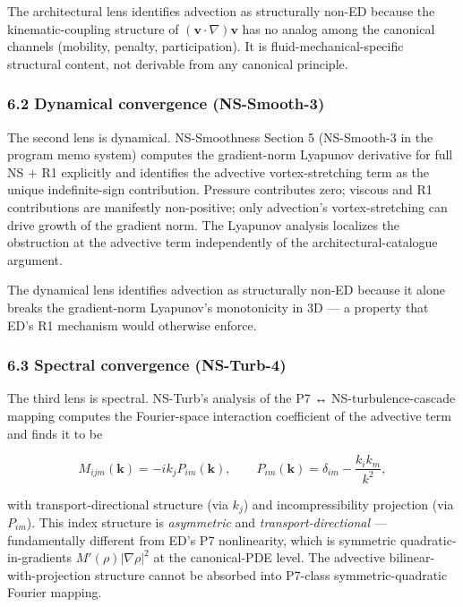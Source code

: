 \documentclass[
]{article}
\begin{document}
The architectural lens identifies advection as structurally non-ED
because the kinematic-coupling structure of
\((\mathbf{v} \cdot \nabla)\mathbf{v}\) has no analog among the
canonical channels (mobility, penalty, participation). It is
fluid-mechanical-specific structural content, not derivable from any
canonical principle.

\subsubsection{6.2 Dynamical convergence
(NS-Smooth-3)}\label{dynamical-convergence-ns-smooth-3}

The second lens is dynamical. NS-Smoothness Section 5 (NS-Smooth-3 in
the program memo system) computes the gradient-norm Lyapunov derivative
for full NS + R1 explicitly and identifies the advective
vortex-stretching term as the unique indefinite-sign contribution.
Pressure contributes zero; viscous and R1 contributions are manifestly
non-positive; only advection's vortex-stretching can drive growth of the
gradient norm. The Lyapunov analysis localizes the obstruction at the
advective term independently of the architectural-catalogue argument.

The dynamical lens identifies advection as structurally non-ED because
it alone breaks the gradient-norm Lyapunov's monotonicity in 3D --- a
property that ED's R1 mechanism would otherwise enforce.

\subsubsection{6.3 Spectral convergence
(NS-Turb-4)}\label{spectral-convergence-ns-turb-4}

The third lens is spectral. NS-Turb's analysis of the P7 ↔
NS-turbulence-cascade mapping computes the Fourier-space interaction
coefficient of the advective term and finds it to be

\[M_{ijm}(\mathbf{k}) = -i k_j P_{im}(\mathbf{k}), \qquad P_{im}(\mathbf{k}) = \delta_{im} - \frac{k_i k_m}{k^2},\]

with transport-directional structure (via \(k_j\)) and incompressibility
projection (via \(P_{im}\)). This index structure is \emph{asymmetric}
and \emph{transport-directional} --- fundamentally different from ED's
P7 nonlinearity, which is symmetric quadratic-in-gradients
\(M'(\rho) |\nabla\rho|^2\) at the canonical-PDE level. The advective
bilinear-with-projection structure cannot be absorbed into P7-class
symmetric-quadratic Fourier mapping.
\end{document}
